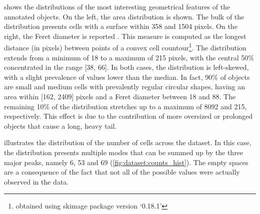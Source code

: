  shows the distributions of the most interesting geometrical features of the annotated objects.
On the left, the area distribution is shown. 
The bulk of the distribution presents cells with a surface within 358 and 1504 pixels.
On the right, the Feret diameter is reported \cite{merkus2009particle}. This measure is computed as the longest distance (in pixels) between points of a convex cell countour\footnote{obtained using skimage package version `0.18.1'}.
The distribution extends from a minimum of 18 to a maximum of 215 pixels, with the central 50\% concentrated in the range [38, 66].
In both cases, the distribution is left-skewed, with a slight prevalence of values lower than the median.
In fact, 90\% of objects are small and medium cells with prevalently regular circular shapes, having an area within [162, 2409] pixels and a Feret diameter between 18 and 88.
The remaining 10\% of the distribution stretches up to a maximum of 8092 and 215, respectively.
This effect is due to the contribution of more oversized or prolonged objects that cause a long, heavy tail.

 illustrates the distribution of the number of cells across the dataset.
In this case, the distribution presents multiple modes that can be summed up by the three major peaks, namely 6, 53 and 69
(\cref{fig:dataset:counts_hist}).
The empty spaces are a consequence of the fact that not all of the possible values were actually observed in the data.

